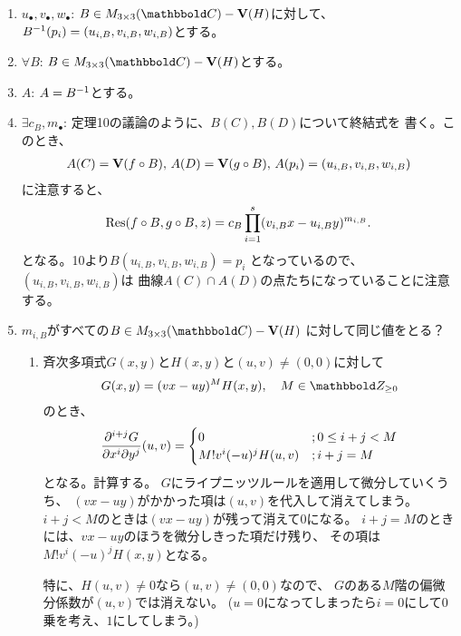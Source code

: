 \begin{myproof}
\begin{enumerate}
    \item $u_{\bullet},v_\bullet,w_\bullet$:
    $B\in M_{3\times 3}(\C) - \var(H)$に対して、
    $B^{-1}(p_i) = (u_{i,B},v_{i,B},w_{i,B})$とする。
    \item $\forall B$: $B\in M_{3\times 3}(\C)- \var(H)$とする。
    \item $A$: $A=B^{-1}$とする。
    \item $\exists c_B, m_\bullet$:
    定理10の議論のように、$B(C),B(D)$について終結式を
    書く。このとき、
    \begin{align}
    A(C) = \textbf V(f\circ B),\, A(D) = \textbf V(g\circ B),\,
    A(p_i) = (u_{i,B},v_{i,B},w_{i,B})
    \end{align}
    に注意すると、
    \begin{align}
      \mathrm{Res}(f\circ B,g\circ B,z)
      =
      c_B\prod_{i=1}^s (v_{i,B}x-u_{i,B}y)^{m_{i,B}}.
    \end{align}
    となる。10より$B(u_{i,B},v_{i,B},w_{i,B}) = p_i$
    となっているので、$(u_{i,B},v_{i,B},w_{i,B})$は
    曲線$A(C) \cap A(D)$の点たちになっていることに注意する。
    \item
    $m_{i,B}$がすべての$B\in M_{3\times 3}(\C)-\var(H)$
    に対して同じ値をとる？
    \begin{enumerate}
      \item 斉次多項式$G(x,y)$と$H(x,y)$と$(u,v)\neq (0,0)$に対して
      \begin{align}
        G(x,y) = (vx-uy)^M H(x,y),\quad M\in \Zge
      \end{align}
      のとき、
      \begin{align}
        \frac{\partial^{i+j}G}{\partial x^i \partial y^j}(u,v)
        =
        \begin{cases}
          0 &; 0\le i+ j < M\\
          M! v^i (-u)^j H(u,v) &; i+j = M
        \end{cases}
      \end{align}
      となる。計算する。
      $G$にライプニッツルールを適用して微分していくうち、
      $(vx-uy)$がかかった項は$(u,v)$を代入して消えてしまう。
      $i+j < M$のときは$(vx-uy)$が残って消えて0になる。
      $i+j=M$のときには、$vx-uy$のほうを微分しきった項だけ残り、
      その項は$M! v^{i} (-u)^j H(x,y)$となる。

      特に、$H(u,v) \neq 0$なら$(u,v)\neq (0,0)$なので、
      $G$のある$M$階の偏微分係数が$(u,v)$では消えない。
      ($u=0$になってしまったら$i=0$にして0乗を考え、$1$にしてしまう。)


\end{enumerate}
\end{enumerate}
\end{myproof}
